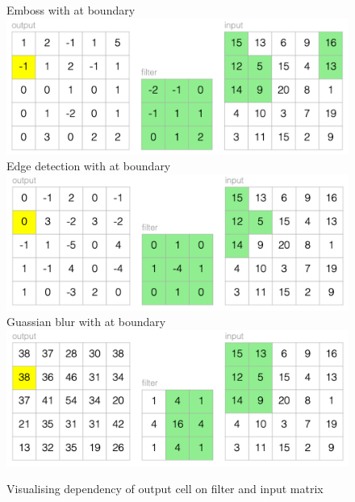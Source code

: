 \begin{figure}[H]
   \subcaptionbox
      {Emboss with  at boundary}
      {\includegraphics[scale=0.4]{fig/example/conv-wrap.png}}
   \subcaptionbox
      {Edge detection with  at boundary}
      {\includegraphics[scale=0.4]{fig/example/conv-extend.png}}
   \subcaptionbox
      {Guassian blur with  at boundary}
      {\includegraphics[scale=0.4]{fig/example/conv-zero.png}}
   \caption{Visualising dependency of output cell on filter and input matrix}
\end{figure}
